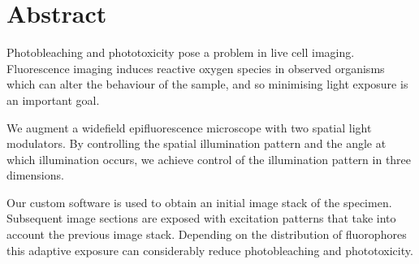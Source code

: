 \section*{Abstract}
\begin{summary}
Photobleaching and phototoxicity pose a problem in live cell
imaging. Fluorescence imaging induces reactive oxygen species in
observed organisms which can alter the behaviour of the sample, and so
minimising light exposure is an important goal.

We augment a widefield epifluorescence microscope with two spatial
light modulators. By controlling the spatial illumination pattern and
the angle at which illumination occurs, we achieve control of the
illumination pattern in three dimensions.

Our custom software is used to obtain an initial image stack of the
specimen. Subsequent image sections are exposed with excitation
patterns that take into account the previous image stack. Depending on
the distribution of fluorophores this adaptive exposure can
considerably reduce photobleaching and phototoxicity.
\end{summary}
